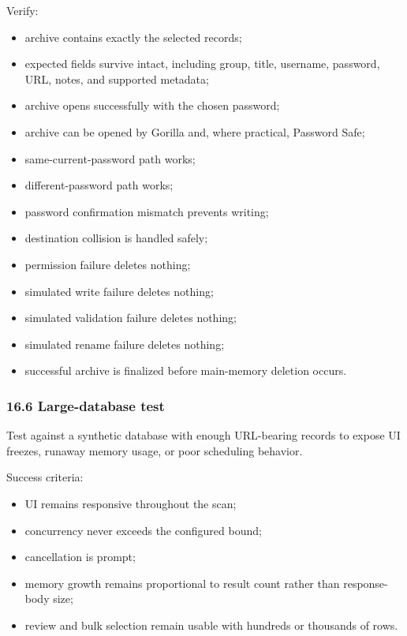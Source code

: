 \documentclass[
  letterpaper,
]{article}
\providecommand{\tightlist}{%
  \setlength{\itemsep}{0pt}\setlength{\parskip}{0pt}}
\begin{document}
Verify:

\begin{itemize}
\tightlist
\item
  archive contains exactly the selected records;
\item
  expected fields survive intact, including group, title, username, password, URL, notes, and supported metadata;
\item
  archive opens successfully with the chosen password;
\item
  archive can be opened by Gorilla and, where practical, Password Safe;
\item
  same-current-password path works;
\item
  different-password path works;
\item
  password confirmation mismatch prevents writing;
\item
  destination collision is handled safely;
\item
  permission failure deletes nothing;
\item
  simulated write failure deletes nothing;
\item
  simulated validation failure deletes nothing;
\item
  simulated rename failure deletes nothing;
\item
  successful archive is finalized before main-memory deletion occurs.
\end{itemize}

\subsubsection{16.6 Large-database test}\label{166-large-database-test}

Test against a synthetic database with enough URL-bearing records to expose UI freezes, runaway memory usage, or poor
scheduling behavior.

Success criteria:

\begin{itemize}
\tightlist
\item
  UI remains responsive throughout the scan;
\item
  concurrency never exceeds the configured bound;
\item
  cancellation is prompt;
\item
  memory growth remains proportional to result count rather than response-body size;
\item
  review and bulk selection remain usable with hundreds or thousands of rows.
\end{itemize}
\end{document}
